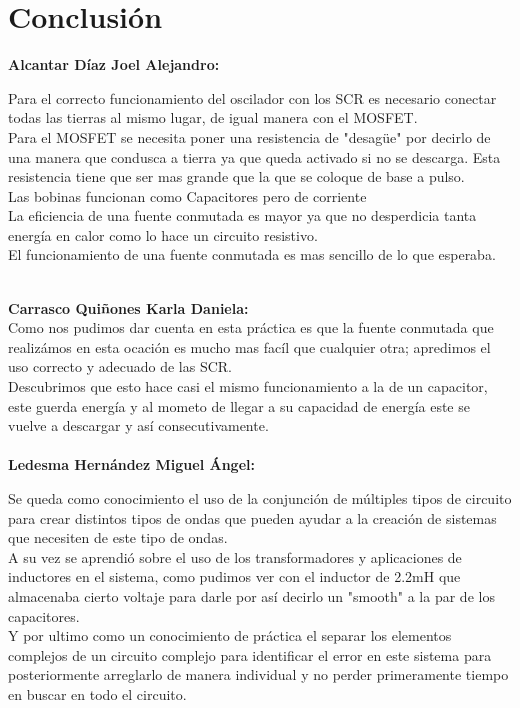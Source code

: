 \documentclass[letterpaper]{article}
\begin{document}
\newpage
\section{Conclusión}
\textbf{Alcantar Díaz Joel Alejandro:\\}
\begin{large}
    Para el correcto funcionamiento del oscilador con los SCR es necesario conectar todas las tierras al mismo lugar, de igual manera con el MOSFET.\\
    Para el MOSFET se necesita poner una resistencia de "desagüe" por decirlo de una manera que condusca a tierra ya que queda activado si no se descarga. Esta resistencia tiene que ser mas grande que la que se coloque de base a pulso.\\
    Las bobinas funcionan como Capacitores pero de corriente\\
    La eficiencia de una fuente conmutada es mayor ya que no desperdicia tanta energía en calor como lo hace un circuito resistivo.\\
    El funcionamiento de una fuente conmutada es mas sencillo de lo que esperaba.\\\\
\end{large}



\textbf{Carrasco Quiñones Karla Daniela:\\}
Como nos pudimos dar cuenta en esta práctica es que la fuente conmutada que realizámos en esta ocación es mucho mas facíl que cualquier otra; apredimos el uso correcto y adecuado de las SCR.\\
Descubrimos que esto hace casi el mismo funcionamiento a la de un capacitor, este guerda energía y al mometo de llegar a su capacidad de energía este se vuelve a descargar y así consecutivamente.\\\\
\textbf{Ledesma Hernández Miguel Ángel:\\}
\begin{large}
    Se queda como conocimiento el uso de la conjunción de múltiples tipos de circuito para crear distintos tipos de ondas que pueden ayudar a la creación de sistemas que necesiten de este tipo de ondas.\\
A su vez se aprendió sobre el uso de los transformadores y aplicaciones de inductores en el sistema, como pudimos ver con el inductor de 2.2mH que almacenaba cierto voltaje para darle por así decirlo un "smooth" a la par de los capacitores.\\
Y por ultimo como un conocimiento de práctica el separar los elementos complejos de un circuito complejo para identificar el error en este sistema para posteriormente arreglarlo de manera individual y no perder primeramente tiempo en buscar en todo el circuito.\\\\
\end{large}
\end{document}
